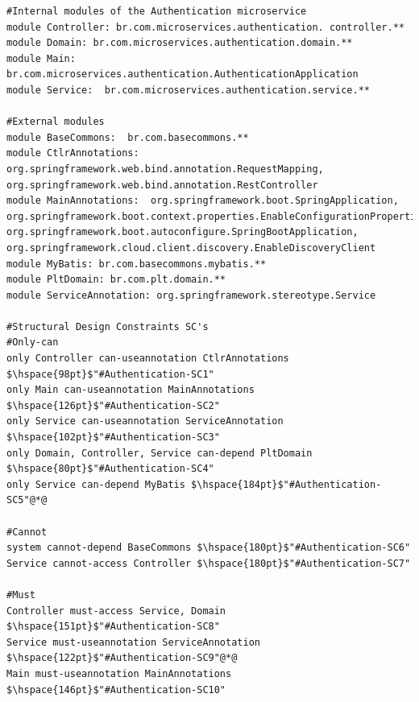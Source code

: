 \documentclass[12pt]{article}
\begin{document}
\begin{lstlisting}[style=colorido, caption={\textcolor{blue}{Authentication microservice's architectural design specification.}},label={list:especArquiteturalAuthentication}
]
#Internal modules of the Authentication microservice
module Controller: br.com.microservices.authentication. controller.**
module Domain: br.com.microservices.authentication.domain.**
module Main: br.com.microservices.authentication.AuthenticationApplication
module Service:  br.com.microservices.authentication.service.**

#External modules
module BaseCommons:  br.com.basecommons.**
module CtlrAnnotations: org.springframework.web.bind.annotation.RequestMapping, org.springframework.web.bind.annotation.RestController
module MainAnnotations:  org.springframework.boot.SpringApplication, org.springframework.boot.context.properties.EnableConfigurationProperties, org.springframework.boot.autoconfigure.SpringBootApplication, org.springframework.cloud.client.discovery.EnableDiscoveryClient
module MyBatis: br.com.basecommons.mybatis.**
module PltDomain: br.com.plt.domain.**
module ServiceAnnotation: org.springframework.stereotype.Service

#Structural Design Constraints SC's
#Only-can
only Controller can-useannotation CtlrAnnotations $\hspace{98pt}$"#Authentication-SC1"
only Main can-useannotation MainAnnotations	$\hspace{126pt}$"#Authentication-SC2"
only Service can-useannotation ServiceAnnotation $\hspace{102pt}$"#Authentication-SC3"
only Domain, Controller, Service can-depend PltDomain $\hspace{80pt}$"#Authentication-SC4"
only Service can-depend MyBatis	$\hspace{184pt}$"#Authentication-SC5"@*@

#Cannot
system cannot-depend BaseCommons $\hspace{180pt}$"#Authentication-SC6"
Service cannot-access Controller $\hspace{180pt}$"#Authentication-SC7"

#Must
Controller must-access Service, Domain	$\hspace{151pt}$"#Authentication-SC8"
Service must-useannotation ServiceAnnotation $\hspace{122pt}$"#Authentication-SC9"@*@
Main must-useannotation MainAnnotations	$\hspace{146pt}$"#Authentication-SC10"
\end{lstlisting}
\end{document}
